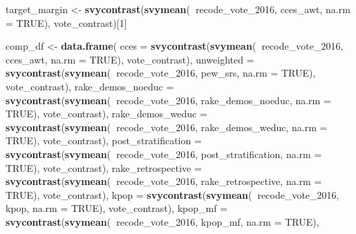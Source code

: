 \documentclass[
]{article}
\newenvironment{Shaded}{\begin{snugshade}}{\end{snugshade}}
\newcommand{\DataTypeTok}[1]{\textcolor[rgb]{0.13,0.29,0.53}{#1}}
\newcommand{\DecValTok}[1]{\textcolor[rgb]{0.00,0.00,0.81}{#1}}
\newcommand{\KeywordTok}[1]{\textcolor[rgb]{0.13,0.29,0.53}{\textbf{#1}}}
\newcommand{\NormalTok}[1]{#1}
\newcommand{\OperatorTok}[1]{\textcolor[rgb]{0.81,0.36,0.00}{\textbf{#1}}}
\newcommand{\OtherTok}[1]{\textcolor[rgb]{0.56,0.35,0.01}{#1}}
\newcommand{\StringTok}[1]{\textcolor[rgb]{0.31,0.60,0.02}{#1}}
\begin{document}
\begin{Shaded}
\begin{Highlighting}[]
\NormalTok{target_margin <-}\StringTok{ }\KeywordTok{svycontrast}\NormalTok{(}\KeywordTok{svymean}\NormalTok{(}\OperatorTok{~}\NormalTok{recode_vote_}\DecValTok{2016}\NormalTok{, cces_awt, }\DataTypeTok{na.rm =} \OtherTok{TRUE}\NormalTok{),}
\NormalTok{                       vote_contrast)[}\DecValTok{1}\NormalTok{]}

\NormalTok{comp_df <-}\StringTok{ }\KeywordTok{data.frame}\NormalTok{(}
    \DataTypeTok{cces =} \KeywordTok{svycontrast}\NormalTok{(}\KeywordTok{svymean}\NormalTok{(}\OperatorTok{~}\NormalTok{recode_vote_}\DecValTok{2016}\NormalTok{, cces_awt, }\DataTypeTok{na.rm =} \OtherTok{TRUE}\NormalTok{),}
\NormalTok{                       vote_contrast),}
    \DataTypeTok{unweighted =} \KeywordTok{svycontrast}\NormalTok{(}\KeywordTok{svymean}\NormalTok{(}\OperatorTok{~}\NormalTok{recode_vote_}\DecValTok{2016}\NormalTok{, pew_srs, }\DataTypeTok{na.rm =} \OtherTok{TRUE}\NormalTok{),}
\NormalTok{                        vote_contrast),}
    \DataTypeTok{rake_demos_noeduc =} \KeywordTok{svycontrast}\NormalTok{(}\KeywordTok{svymean}\NormalTok{(}\OperatorTok{~}\NormalTok{recode_vote_}\DecValTok{2016}\NormalTok{, rake_demos_noeduc, }\DataTypeTok{na.rm =} \OtherTok{TRUE}\NormalTok{),}
\NormalTok{                        vote_contrast),}
    \DataTypeTok{rake_demos_weduc =} \KeywordTok{svycontrast}\NormalTok{(}\KeywordTok{svymean}\NormalTok{(}\OperatorTok{~}\NormalTok{recode_vote_}\DecValTok{2016}\NormalTok{, rake_demos_weduc, }\DataTypeTok{na.rm =} \OtherTok{TRUE}\NormalTok{),}
\NormalTok{                        vote_contrast),}
    \DataTypeTok{post_stratification =} \KeywordTok{svycontrast}\NormalTok{(}\KeywordTok{svymean}\NormalTok{(}\OperatorTok{~}\NormalTok{recode_vote_}\DecValTok{2016}\NormalTok{, post_stratification, }\DataTypeTok{na.rm =} \OtherTok{TRUE}\NormalTok{),}
\NormalTok{                        vote_contrast),}
    \DataTypeTok{rake_retrospective =} \KeywordTok{svycontrast}\NormalTok{(}\KeywordTok{svymean}\NormalTok{(}\OperatorTok{~}\NormalTok{recode_vote_}\DecValTok{2016}\NormalTok{, rake_retrospective, }\DataTypeTok{na.rm =} \OtherTok{TRUE}\NormalTok{),}
\NormalTok{                        vote_contrast),}
    \DataTypeTok{kpop =} \KeywordTok{svycontrast}\NormalTok{(}\KeywordTok{svymean}\NormalTok{(}\OperatorTok{~}\NormalTok{recode_vote_}\DecValTok{2016}\NormalTok{, kpop, }\DataTypeTok{na.rm =} \OtherTok{TRUE}\NormalTok{),}
\NormalTok{                        vote_contrast),}
    \DataTypeTok{kpop_mf =} \KeywordTok{svycontrast}\NormalTok{(}\KeywordTok{svymean}\NormalTok{(}\OperatorTok{~}\NormalTok{recode_vote_}\DecValTok{2016}\NormalTok{, kpop_mf, }\DataTypeTok{na.rm =} \OtherTok{TRUE}\NormalTok{),}

\end{Highlighting}
\end{Shaded}
\end{document}
